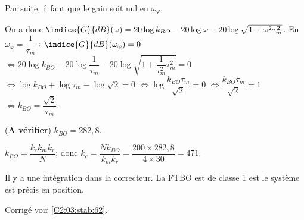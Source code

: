 Par suite, il faut que le gain soit nul en $\omega_{\varphi}$.

On a donc $\indice{G}{dB}(\omega)=20\log k_{BO}-20\log\omega-20\log\sqrt{1+\omega^2\tau_m^2}$.
En $\omega_{\varphi} =  \dfrac{1}{\tau_m}$ :
$\indice{G}{dB}(\omega_{\varphi})=0$ 
$\Leftrightarrow 20\log k_{BO}-20\log \dfrac{1}{\tau_m}-20\log\sqrt{1+\dfrac{1}{\tau_m^2}\tau_m^2}=0$
$\Leftrightarrow \log k_{BO}+\log \tau_m-\log\sqrt{2}=0$
$\Leftrightarrow \log \dfrac{k_{BO} \tau_m}{\sqrt{2}}=0$
$\Leftrightarrow \dfrac{k_{BO} \tau_m}{\sqrt{2}}=1$
$\Leftrightarrow k_{BO}=\dfrac{\sqrt{2}}{\tau_m}$.

(\textbf{A vérifier})
$k_{BO}=282,8$.

\else 
\fi

\ifprof
$k_{BO}=\dfrac{k_c k_m k_r}{N}$; donc 
$k_c=\dfrac{Nk_{BO}}{ k_m k_r} = \dfrac{200 \times 282,8 }{4\times 30}=471$.
\else 
\fi

\ifprof
Il y a une intégration dans la correcteur. La FTBO est de classe 1 est le système est précis en position. 
\else 
\fi

 

\ifprof
\else

\noindent\footnotesize
{}
\normalsize

\begin{flushright}
\footnotesize{Corrigé  voir \ref{C2:03:stab:62}.}
\end{flushright}%
\fi